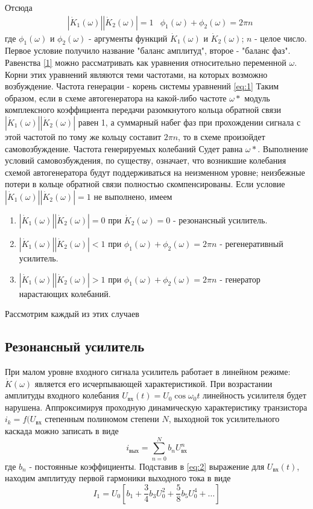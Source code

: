 Отсюда 
\begin{equation}
\begin{aligned}
& |\dot{K}_1(\omega)||\dot{K}_2(\omega)|=1 & \phi_1(\omega)+\phi_2(\omega)=2\pi n
\end{aligned}
\label{eq:1}
\end{equation}
где $\phi_1(\omega)$ и $\phi_2(\omega)$ - аргументы функций $\dot{K}_1(\omega)$ и $\dot{K}_2(\omega)$; $n$ - целое число. Первое условие получило название "баланс амплитуд", второе - "баланс фаз".
Равенства \eqref{1} можно рассматривать как уравнения относительно переменной $\omega$. Корни этих уравнений являются теми частотами, на которых возможно возбуждение. Частота генерации - корень системы уравнений \eqref{eq:1}
Таким образом, если в схеме автогенератора на какой-либо частоте $\omega *$ модуль комплексного коэффициента передачи разомкнутого кольца обратной связи $|\dot{K}_1(\omega)||\dot{K}_2(\omega)|$ равен 1, а суммарный набег фаз при прохождении сигнала с этой частотой по тому же кольцу составит $2\pi n$, то в схеме произойдет самовозбуждение. Частота генерируемых колебаний Судет равна $\omega *$.
Выполнение условий самовозбуждения, по существу, означает, что возникшие колебания схемой автогенератора будут поддерживаться на неизменном уровне; неизбежные потери в кольце обратной связи полностью скомпенсированы.
Если условие $|\dot{K}_1(\omega)||\dot{K}_2(\omega)|=1$ не выполнено, имеем
\begin{enumerate}
\item {
	$|\dot{K}_1(\omega)||\dot{K}_2(\omega)|=0$ при $\dot{K}_2(\omega)=0$ - резонансный усилитель. 
}
\item {
	$|\dot{K}_1(\omega)||\dot{K}_2(\omega)|<1$ при $\phi_1(\omega)+\phi_2(\omega)=2\pi n$ - регенеративный усилитель.
}
\item {
	$|\dot{K}_1(\omega)||\dot{K}_2(\omega)|>1$ при $\phi_1(\omega)+\phi_2(\omega)=2\pi n$ - генератор нарастающих колебаний.
}
\end{enumerate}
Рассмотрим каждый из этих случаев

\subsection{Резонансный усилитель}
При малом уровне входного сигнала усилитель работает в линейном режиме: $\dot{K}(\omega)$ является его исчерпывающей характеристикой.
При возрастании амплитуды входного колебания $U_\text{вх}(t)=U_0\cos \omega_0 t$ линейность усилителя будет нарушена. Аппроксимируя проходную динамическую характеристику транзистора $i_k=f(U_\text{вх}$ степенным полиномом степени $N$, выходной ток усилительного каскада можно записать в виде
\begin{equation}
i_\text{вых}=\sum\limits_{n=0}^{N}b_n U^n_\text{вх}
\label{eq:2}
\end{equation}
где $b_n$ - постоянные коэффициенты.
Подставив в \eqref{eq:2} выражение для $U_\text{вх}(t)$, находим амплитуду первой гармоники выходного тока в виде
\begin{equation}
I_1=U_0[b_1+\frac{3}{4}b_3U_0^2+\frac{5}{8}b_5U_0^4+\ldots]
\label{eq:3}
\end{equation}

